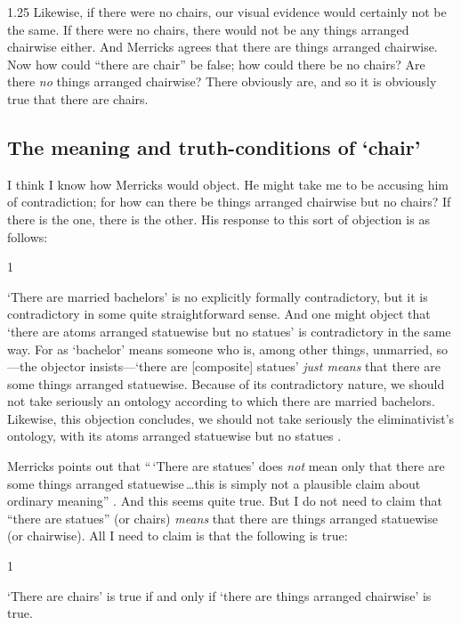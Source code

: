 \documentclass[11pt]{article}
\newenvironment{squote}{%
\begin{spacing}{1}
       	\begin{list}{}{%
\setlength{\labelwidth}{0pt}%
\rightmargin\leftmargin%
}
\item\relax
}{%
\end{list}%
\end{spacing}
}
\begin{document}
\begin{spacing}{1.25}
Likewise, if there were no chairs, our visual evidence would certainly
not be the same.  If there were no chairs, there would not be any
things arranged chairwise either.  And Merricks agrees that there are
things arranged chairwise.  Now how could ``there are chair'' be
false; how could there be no chairs?  Are there {\em no} things
arranged chairwise?  There obviously are, and so it is obviously true
that there are chairs.

\subsection{The meaning and truth-conditions of `chair'}
\label{meaning}
I think I know how Merricks would object.  He might take me to be
accusing him of contradiction; for how can there be things arranged
chairwise but no chairs?  If there is the one, there is the other.
His response to this sort of objection is as follows:

\begin{squote}
`There are married bachelors' is no explicitly formally contradictory,
  but it is contradictory in some quite straightforward sense.  And
  one might object that `there are atoms arranged statuewise but no
  statues' is contradictory in the same way.  For as `bachelor' means
  someone who is, among other things, unmarried, so---the objector
  insists---`there are [composite] statues' {\em just means} that
  there are some things arranged statuewise.  Because of its
  contradictory nature, we should not take seriously an ontology
  according to which there are married bachelors.  Likewise, this
  objection concludes, we should not take seriously the
  eliminativist's ontology, with its atoms arranged statuewise but no
  statues \citeyearpar[13]{merricks2001a}.
\end{squote}

Merricks points out that ``\,`There are statues' does {\em not} mean
only that there are some things arranged statuewise\,\ldots this is
simply not a plausible claim about ordinary meaning''
\citeyearpar[13]{merricks2001a}.  And this seems quite true.  But I do
not need to claim that ``there are statues'' (or chairs) {\em means}
that there are things arranged statuewise (or chairwise).  All I need
to claim is that the following is true:

\begin{squote}
`There are chairs' is true if and only if `there are things arranged
  chairwise' is true.
\end{squote}


\end{spacing}
\end{document}
